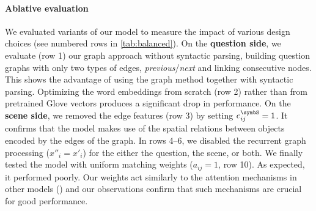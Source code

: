 \paragraph{Ablative evaluation}
We evaluated variants of our model to measure the impact of various design choices (see numbered rows in \tab\ref{tab:balanced}). On the \textbf{question side}, we evaluate (row 1) our graph approach without syntactic parsing, building question graphs with only two types of edges, \textit{previous}/\textit{next} and linking consecutive nodes. This shows the advantage of using the graph method together with syntactic parsing. Optimizing the word embeddings from scratch (row 2) rather than from pretrained Glove vectors \cite{pennington2014glove} produces a significant drop in performance. On the \textbf{scene side}, we removed the edge features (row 3) by setting $e_{ij}^\symbS=1$. It confirms that the model makes use of the spatial relations between objects encoded by the edges of the graph. In rows 4--6, we disabled the recurrent graph processing ($x''_i=x'_i$) for the either the question, the scene, or both. We finally tested the model with uniform matching weights ($a_{ij}=1$, row 10). As expected, it performed poorly. Our weights act similarly to the attention mechanisms in other models (\eg\cite{zhu2015visual7w,xu2015ask,Chen2015ABC,Jiang2015compositional,yang2015stacked}) and our observations confirm that such mechanisms are crucial for good performance.


\renewcommand{\arraystretch}{1.2}

